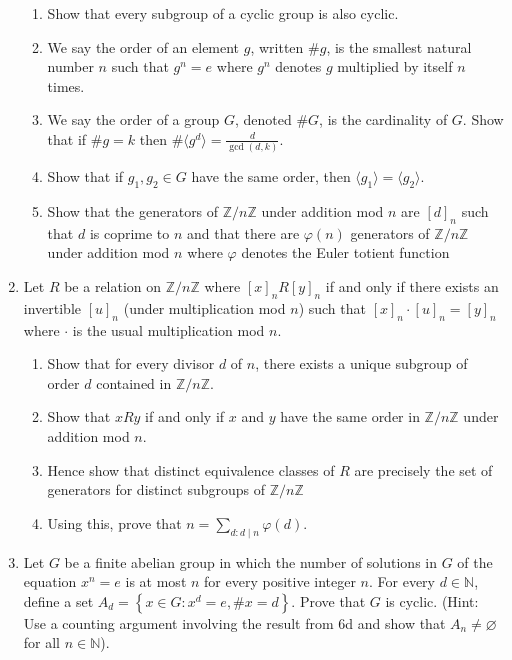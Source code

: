 \documentclass[letterpaper,12pt]{article}
\newcommand{\set}[1]{\left\{ #1 \right\}}
\begin{document}
\begin{enumerate}
\begin{enumerate}
    \item Show that every subgroup of a cyclic group is also cyclic.
    \item We say the order of an element $g$, written $\#g$, is the smallest natural number $n$ such that $g^n = e$ where $g^n$ denotes $g$ multiplied by itself $n$ times. 
    \item We say the order of a group $G$, denoted $\# G$, is the cardinality of $G$. Show that if $\# g = k$ then $\# \langle g^d \rangle = \frac{d}{\gcd(d,k)}$.
    \item Show that if $g_1,g_2 \in G$ have the same order, then $\langle g_1 \rangle = \langle g_2 \rangle$.
    \item Show that the generators of $\mathbb{Z}/n\mathbb{Z}$ under addition mod $n$ are $[d]_n$ such that $d$ is coprime to $n$ and that there are $\varphi (n)$ generators of $\mathbb{Z}/n\mathbb{Z}$ under addition mod $n$ where $\varphi$ denotes the Euler totient function
\end{enumerate}
\item Let $R$ be a relation on $\mathbb{Z}/n\mathbb{Z}$ where $[x]_n R [y]_n$ if and only if there exists an invertible $[u]_n$ (under multiplication mod $n$) such that $[x]_n\cdot[u]_n = [y]_n$ where $\cdot$ is the usual multiplication mod $n$.
\begin{enumerate}
    \item Show that for every divisor $d$ of $n$, there exists a unique subgroup of order $d$ contained in $\mathbb{Z}/n\mathbb{Z}$.
    \item Show that $xRy$ if and only if $x$ and $y$ have the same order in $\mathbb{Z}/n\mathbb{Z}$ under addition mod $n$.
    \item Hence show that distinct equivalence classes of $R$ are precisely the set of generators for distinct subgroups of $\mathbb{Z}/n\mathbb{Z}$
    \item Using this, prove that $n=\sum_{d:d\mid n}\varphi(d)$.
\end{enumerate}
\item Let $G$ be a finite abelian group in which the number of solutions in $G$ of the equation $x^n = e$ is at most $n$ for every positive integer $n$. For every $d \in \mathbb{N}$, define a set $A_d = \set{x\in G: x^d = e, \# x = d}$. Prove that $G$ is cyclic. (Hint: Use a counting argument involving the result from 6d and show that $A_n \neq \varnothing$ for all $n\in \mathbb{N}$).
\end{enumerate}
\end{document}

